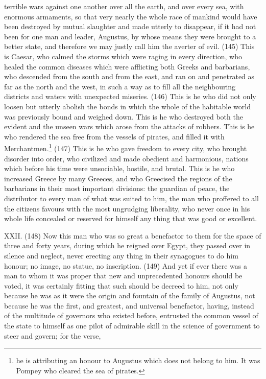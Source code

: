 terrible wars against one another over all the earth, and over every sea, with enormous
armaments, so that very nearly the whole race of mankind would have been destroyed by mutual
slaughter and made utterly to disappear, if it had not been for one man and leader, Augustus, by
whose means they were brought to a better state, and therefore we may justly call him the averter
of evil. (145) This is Caesar, who calmed the storms which were raging in every direction, who
healed the common diseases which were afflicting both Greeks and barbarians, who descended
from the south and from the east, and ran on and penetrated as far as the north and the west, in
such a way as to fill all the neighbouring districts and waters with unexpected miseries. (146) This
is he who did not only loosen but utterly abolish the bonds in which the whole of the habitable world
was previously bound and weighed down. This is he who destroyed both the evident and the
unseen wars which arose from the attacks of robbers. This is he who rendered the sea free from
the vessels of pirates, and filled it with Merchantmen.\footnote{he is attributing an honour to Augustus which does
not belong to him. It was Pompey who cleared the sea of pirates.} (147) This is he who gave freedom to every
city, who brought disorder into order, who civilized and made obedient and harmonious, nations
which before his time were unsociable, hostile, and brutal. This is he who increased Greece by
many Greeces, and who Greecised the regions of the barbarians in their most important divisions:
the guardian of peace, the distributor to every man of what was suited to him, the man who
proffered to all the citizens favours with the most ungrudging liberality, who never once in his whole
life concealed or reserved for himself any thing that was good or excellent.

XXII. (148) Now this man who was so great a benefactor to them for the space of three and forty
years, during which he reigned over Egypt, they passed over in silence and neglect, never erecting
any thing in their synagogues to do him honour; no image, no statue, no inscription. (149) And yet if
ever there was a man to whom it was proper that new and unprecedented honours should be
voted, it was certainly fitting that such should be decreed to him, not only because he was as it
were the origin and fountain of the family of Augustus, not because he was the first, and greatest,
and universal benefactor, having, instead of the multitude of governors who existed before,
entrusted the common vessel of the state to himself as one pilot of admirable skill in the science of
government to steer and govern; for the verse,

